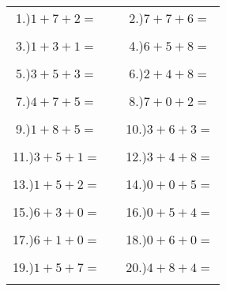 \documentclass{article}
\begin{document}
\begin{tabular}{ccc}
1.)$1+7+2=$& \hspace{5cm} &2.)$7+7+6=$\\\\
3.)$1+3+1=$& \hspace{5cm} &4.)$6+5+8=$\\\\
5.)$3+5+3=$& \hspace{5cm} &6.)$2+4+8=$\\\\
7.)$4+7+5=$& \hspace{5cm} &8.)$7+0+2=$\\\\
9.)$1+8+5=$& \hspace{5cm} &10.)$3+6+3=$\\\\
11.)$3+5+1=$& \hspace{5cm} &12.)$3+4+8=$\\\\
13.)$1+5+2=$& \hspace{5cm} &14.)$0+0+5=$\\\\
15.)$6+3+0=$& \hspace{5cm} &16.)$0+5+4=$\\\\
17.)$6+1+0=$& \hspace{5cm} &18.)$0+6+0=$\\\\
19.)$1+5+7=$& \hspace{5cm} &20.)$4+8+4=$\\\\
\end{tabular}
\newpage
\end{document}
